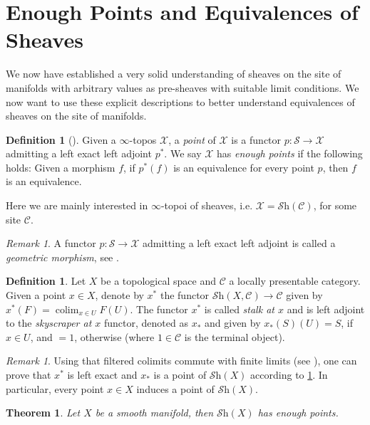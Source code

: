 \documentclass[a4paper]{book}
\newcommand{\lC}{\mathcal{C}}
\newcommand{\lS}{\mathcal{S}}
\newcommand{\lX}{\mathcal{X}}
\newcommand{\Shv}{\lS\mathrm{h}} %
\DeclareMathOperator*\colim{colim} %
\newtheorem{theorem}[equation]{Theorem}
\theoremstyle{definition}
\newtheorem{definition}[equation]{Definition}
\theoremstyle{remark}
\newtheorem{remark}[equation]{Remark}
\numberwithin{equation}{section}
\begin{document}
\section{Enough Points and Equivalences of Sheaves}
We now have established a very solid understanding of sheaves on the site of manifolds with arbitrary values as pre-sheaves with suitable limit conditions. We now want to use these explicit descriptions to better understand equivalences of sheaves on the site of manifolds.
\begin{definition}[{\cite[Remark 6.5.4.8]{lurie2009htt}}]\label{def:point}
	Given a $\infty$-topos $\lX$, a \emph{point} of $\lX$ is a functor $p:\lS\to\lX$ admitting a left exact left adjoint $p^*$. We say $\lX$ has \emph{enough points} if the following holds: Given a morphism $f$, if $p^*(f)$ is an equivalence for every point $p$, then $f$ is an equivalence.
\end{definition}
Here we are mainly interested in $\infty$-topoi of sheaves, i.e. $\lX=\Shv(\lC)$, for some site $\lC$.
\begin{remark}
	A functor $p:\lS\to\lX$ admitting a left exact left adjoint is called a \emph{geometric morphism}, see \cite[Definition 6.3.1.1]{lurie2009htt}. 
\end{remark}
\begin{definition}\label{def:stalk}
	Let $X$ be a topological space and $\lC$ a locally presentable category. Given a point $x\in X$, denote by $x^*$ the functor $\Shv(X,\lC)\to\lC$ given by $x^*(F)=\colim_{x\in U}F(U)$. The functor $x^*$ is called 
	\emph{stalk at $x$} and is left adjoint to the \emph{skyscraper at $x$} functor, denoted as $x_*$ and given by $x_*(S)(U)=S$, if $x\in U$, and $=1$, otherwise (where $1\in\lC$ is the terminal object).
\end{definition}
\begin{remark}\label{rmk:pointsheaf}
	Using that filtered colimits commute with finite limits (see \cite[Example 7.3.4.7]{lurie2009htt}), one can prove that $x^*$ is left exact and $x_*$ is a point of $\Shv(X)$ according to \cref{def:point}. In particular, every point $x\in X$ induces a point of $\Shv(X)$. 
\end{remark}
\begin{theorem}\label{thm:enougpoints}
	Let $X$ be a smooth manifold, then $\Shv(X)$ has enough points. 
\end{theorem}
\end{document}
